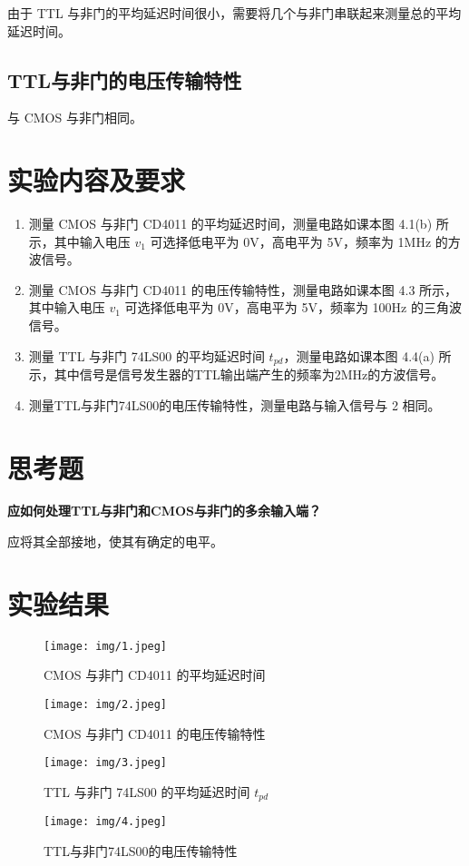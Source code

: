 \documentclass[a4paper]{article}
\begin{document}
由于 TTL 与非门的平均延迟时间很小，需要将几个与非门串联起来测量总的平均延迟时间。

\subsection{TTL与非门的电压传输特性}

与 CMOS 与非门相同。

\section{实验内容及要求}

\begin{enumerate}
    \item 测量 CMOS 与非门 CD4011 的平均延迟时间，测量电路如课本图 4.1(b) 所示，其中输入电压 $v_1$ 可选择低电平为 0V，高电平为 5V，频率为 1MHz 的方波信号。
    \item 测量 CMOS 与非门 CD4011 的电压传输特性，测量电路如课本图 4.3 所示，其中输入电压 $v_1$ 可选择低电平为 0V，高电平为 5V，频率为 100Hz 的三角波信号。
    \item 测量 TTL 与非门 74LS00 的平均延迟时间 $t_{{pd}}$，测量电路如课本图 4.4(a) 所示，其中信号是信号发生器的TTL输出端产生的频率为2MHz的方波信号。
    \item 测量TTL与非门74LS00的电压传输特性，测量电路与输入信号与 2 相同。
\end{enumerate}

\section{思考题}

\textbf{应如何处理TTL与非门和CMOS与非门的多余输入端？}

应将其全部接地，使其有确定的电平。

\section{实验结果}

\begin{figure}
    \texttt{[image: img/1.jpeg]}
    \caption{CMOS 与非门 CD4011 的平均延迟时间}
\end{figure}

\begin{figure}
    \texttt{[image: img/2.jpeg]}
    \caption{CMOS 与非门 CD4011 的电压传输特性}
\end{figure}

\begin{figure}
    \texttt{[image: img/3.jpeg]}
    \caption{TTL 与非门 74LS00 的平均延迟时间 $t_{{pd}}$}
\end{figure}

\begin{figure}
    \texttt{[image: img/4.jpeg]}
    \caption{TTL与非门74LS00的电压传输特性}
\end{figure}
\end{document}
